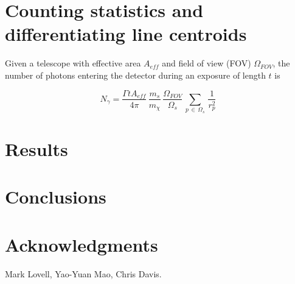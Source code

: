 \documentclass[aps,prl,10pt,twocolumn,superscriptaddress,showpacs]{revtex4-1}
\begin{document}
\section{Counting statistics and differentiating line centroids}

Given a telescope with effective area $A_{eff}$ and field of view (FOV) $\Omega_{FOV}$, the number
of photons entering the detector during an exposure of length $t$ is

\begin{equation} 
	N_\gamma = \frac{\Gamma t A_{eff}}{4\pi}
	\, \frac{m_s}{m_\chi} \, \frac{\Omega_{FOV}}{\Omega_s} \, \sum_{p \, \in \, \Omega_s} \, \frac{1}{r_p^{2}} 
\end{equation}



\section{Results}
\label{sec:results}



\section{Conclusions}
\label{sec:conclusions}

 
\vspace{-0.5 cm}
	

\section*{Acknowledgments} 

Mark Lovell, Yao-Yuan Mao, Chris Davis.


\newcommand{\mnras}[0]{M.N.R.A.S.}

%	
	
\end{document}
